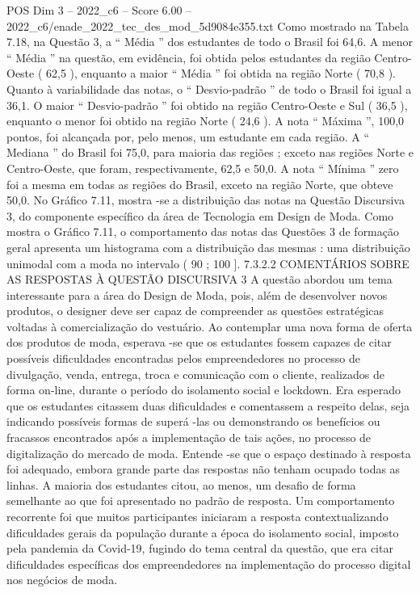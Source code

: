 \begin{textsample}{POS Dim 3 – 2022\_c6 – Score 6.00 – 2022\_c6/enade\_2022\_tec\_des\_mod\_5d9084e355.txt}
Como mostrado na Tabela 7.18, na Questão 3, a “ Média ” dos estudantes de todo o Brasil foi 64,6.
A menor “ Média ” na questão, em evidência, foi obtida pelos estudantes da região Centro-Oeste ( 62,5 ), enquanto a maior “ Média ” foi obtida na região Norte ( 70,8 ).
Quanto à variabilidade das notas, o “ Desvio-padrão ” de todo o Brasil foi igual a 36,1.
O maior “ Desvio-padrão ” foi obtido na região Centro-Oeste e Sul ( 36,5 ), enquanto o menor foi obtido na região Norte ( 24,6 ).
A nota “ Máxima ”, 100,0 pontos, foi alcançada por, pelo menos, um estudante em cada região.
A “ Mediana ” do Brasil foi 75,0, para maioria das regiões ; exceto nas regiões Norte e Centro-Oeste, que foram, respectivamente, 62,5 e 50,0.
A nota “ Mínima ” zero foi a mesma em todas as regiões do Brasil, exceto na região Norte, que obteve 50,0.
No Gráfico 7.11, mostra -se a distribuição das notas na Questão Discursiva 3, do componente específico da área de Tecnologia em Design de Moda.
Como mostra o Gráfico 7.11, o comportamento das notas das Questões 3 de formação geral apresenta um histograma com a distribuição das mesmas : uma distribuição unimodal com a moda no intervalo ( 90 ; 100 ]. 7.3.2.2 COMENTÁRIOS SOBRE AS RESPOSTAS À QUESTÃO DISCURSIVA 3 A questão abordou um tema interessante para a área do Design de Moda, pois, além de desenvolver novos produtos, o designer deve ser capaz de compreender as questões estratégicas voltadas à comercialização do vestuário.
Ao contemplar uma nova forma de oferta dos produtos de moda, esperava -se que os estudantes fossem capazes de citar possíveis dificuldades encontradas pelos empreendedores no processo de divulgação, venda, entrega, troca e comunicação com o cliente, realizados de forma on-line, durante o período do isolamento social e lockdown.
Era esperado que os estudantes citassem duas dificuldades e comentassem a respeito delas, seja indicando possíveis formas de superá -las ou demonstrando os benefícios ou fracassos encontrados após a implementação de tais ações, no processo de digitalização do mercado de moda.
Entende -se que o espaço destinado à resposta foi adequado, embora grande parte das respostas não tenham ocupado todas as linhas.
A maioria dos estudantes citou, ao menos, um desafio de forma semelhante ao que foi apresentado no padrão de resposta.
Um comportamento recorrente foi que muitos participantes iniciaram a resposta contextualizando dificuldades gerais da população durante a época do isolamento social, imposto pela pandemia da Covid-19, fugindo do tema central da questão, que era citar dificuldades específicas dos empreendedores na implementação do processo digital nos negócios de moda.

\end{textsample}
